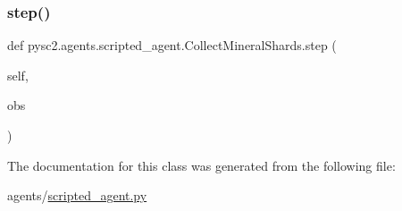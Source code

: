 \subsubsection{\texorpdfstring{step()}{step()}}
{\footnotesize\ttfamily def pysc2.\+agents.\+scripted\+\_\+agent.\+Collect\+Mineral\+Shards.\+step (\begin{DoxyParamCaption}\item[{}]{self,  }\item[{}]{obs }\end{DoxyParamCaption})}



The documentation for this class was generated from the following file\+:\begin{DoxyCompactItemize}
\item 
agents/\mbox{\hyperlink{scripted__agent_8py}{scripted\+\_\+agent.\+py}}\end{DoxyCompactItemize}
